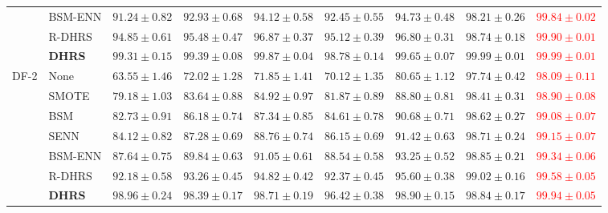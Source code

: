 \documentclass[pdflatex,sn-mathphys-num]{sn-jnl}%
\theoremstyle{thmstyleone}%
\theoremstyle{thmstyletwo}%
\theoremstyle{thmstylethree}%
\begin{document}
\begin{table}[!ht]
{\begin{tabular}{@{}llccccccc@{}}
& BSM-ENN
& $91.24\pm0.82$
& $92.93\pm0.68$
& $94.12\pm0.58$
& $92.45\pm0.55$
& $94.73\pm0.48$
& $98.21\pm0.26$
& \textcolor{red}{$99.84\pm0.02$} \\

& R-DHRS
& $94.85\pm0.61$
& $95.48\pm0.47$
& $96.87\pm0.37$
& $95.12\pm0.39$
& $96.80\pm0.31$
& $98.74\pm0.18$
& \textcolor{red}{$99.90\pm0.01$} \\

& \textbf{DHRS}
& \textbf{$99.31\pm0.15$}
& \textbf{$99.39\pm0.08$}
& \textbf{$99.87\pm0.04$}
& \textbf{$98.78\pm0.14$}
& \textbf{$99.65\pm0.07$}
& \textbf{$99.99\pm0.01$}
& \textcolor{red}{\textbf{$99.99\pm0.01$}} \\

\midrule

\multirow{7}{*}{DF-2}

& None
& $63.55\pm1.46$
& $72.02\pm1.28$
& $71.85\pm1.41$
& $70.12\pm1.35$
& $80.65\pm1.12$
& $97.74\pm0.42$
& \textcolor{red}{$98.09\pm0.11$} \\

& SMOTE
& $79.18\pm1.03$
& $83.64\pm0.88$
& $84.92\pm0.97$
& $81.87\pm0.89$
& $88.80\pm0.81$
& $98.41\pm0.31$
& \textcolor{red}{$98.90\pm0.08$} \\

& BSM
& $82.73\pm0.91$
& $86.18\pm0.74$
& $87.34\pm0.85$
& $84.61\pm0.78$
& $90.68\pm0.71$
& $98.62\pm0.27$
& \textcolor{red}{$99.08\pm0.07$} \\

& SENN
& $84.12\pm0.82$
& $87.28\pm0.69$
& $88.76\pm0.74$
& $86.15\pm0.69$
& $91.42\pm0.63$
& $98.71\pm0.24$
& \textcolor{red}{$99.15\pm0.07$} \\

& BSM-ENN
& $87.64\pm0.75$
& $89.84\pm0.63$
& $91.05\pm0.61$
& $88.54\pm0.58$
& $93.25\pm0.52$
& $98.85\pm0.21$
& \textcolor{red}{$99.34\pm0.06$} \\

& R-DHRS
& $92.18\pm0.58$
& $93.26\pm0.45$
& $94.82\pm0.42$
& $92.37\pm0.45$
& $95.60\pm0.38$
& \textbf{$99.02\pm0.16$}
& \textcolor{red}{$99.58\pm0.05$} \\

& \textbf{DHRS}
& \textbf{$98.96\pm0.24$}
& \textbf{$98.39\pm0.17$}
& \textbf{$98.71\pm0.19$}
& \textbf{$96.42\pm0.38$}
& \textbf{$98.90\pm0.15$}
& $98.84\pm0.17$
& \textcolor{red}{\textbf{$99.94\pm0.05$}} \\


\end{tabular}}
\end{table}
\end{document}
